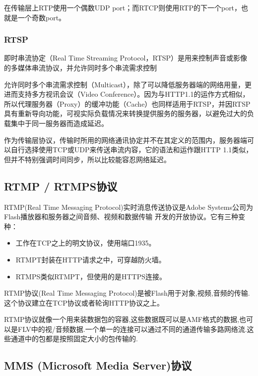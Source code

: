 \documentclass[bachelor]{thesis-uestc}
\begin{document}
\par 在传输层上RTP使用一个偶数UDP port；而RTCP则使用RTP的下一个port，也就是一个奇数port。

\subsubsection{RTSP}
\par 即时串流协定（Real Time Streaming Protocol，RTSP）是用来控制声音或影像的多媒体串流协议，并允许同时多个串流需求控制

\par 允许同时多个串流需求控制（Multicast），除了可以降低服务器端的网络用量，更进而支持多方视讯会议（Video Conference）。因为与HTTP1.1的运作方式相似，所以代理服务器（Proxy）的缓冲功能（Cache）也同样适用于RTSP，并因RTSP具有重新导向功能，可视实际负载情况来转换提供服务的服务器，以避免过大的负载集中于同一服务器而造成延迟。

\par 作为传输层协议，传输时所用的网络通讯协定并不在其定义的范围内，服务器端可以自行选择使用TCP或UDP来传送串流内容，它的语法和运作跟HTTP 1.1类似，但并不特别强调时间同步，所以比较能容忍网络延迟。


\subsection{RTMP / RTMPS协议}
\par RTMP(Real Time Messaging Protocol)实时消息传送协议是Adobe Systems公司为Flash播放器和服务器之间音频、视频和数据传输 开发的开放协议。它有三种变种：

\begin{itemize}
	\item 工作在TCP之上的明文协议，使用端口1935。
	\item RTMPT封装在HTTP请求之中，可穿越防火墙。
	\item RTMPS类似RTMPT，但使用的是HTTPS连接。
\end{itemize}


\par RTMP协议(Real Time Messaging Protocol)是被Flash用于对象,视频,音频的传输.这个协议建立在TCP协议或者轮询HTTP协议之上。

\par RTMP协议就像一个用来装数据包的容器,这些数据既可以是AMF格式的数据,也可以是FLV中的视/音频数据.一个单一的连接可以通过不同的通道传输多路网络流.这些通道中的包都是按照固定大小的包传输的.


\subsection{MMS (Microsoft Media Server)协议}
\end{document}
